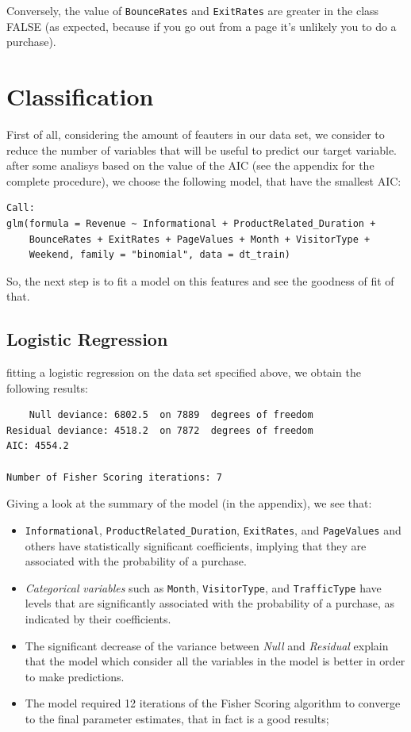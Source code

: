 \documentclass[
]{article}
\begin{document}
Conversely, the value of \texttt{BounceRates} and \texttt{ExitRates} are
greater in the class FALSE (as expected, because if you go out from a
page it's unlikely you to do a purchase).

\newpage

\section{Classification}\label{classification}

First of all, considering the amount of feauters in our data set, we
consider to reduce the number of variables that will be useful to
predict our target variable. after some analisys based on the value of
the AIC (see the appendix for the complete procedure), we choose the
following model, that have the smallest AIC:

\begin{verbatim}
Call:
glm(formula = Revenue ~ Informational + ProductRelated_Duration + 
    BounceRates + ExitRates + PageValues + Month + VisitorType + 
    Weekend, family = "binomial", data = dt_train)
\end{verbatim}

So, the next step is to fit a model on this features and see the
goodness of fit of that.

\subsection{Logistic Regression}\label{logistic-regression}

fitting a logistic regression on the data set specified above, we obtain
the following results:

\begin{verbatim}
    Null deviance: 6802.5  on 7889  degrees of freedom
Residual deviance: 4518.2  on 7872  degrees of freedom
AIC: 4554.2

Number of Fisher Scoring iterations: 7
\end{verbatim}

Giving a look at the summary of the model (in the appendix), we see
that:

\begin{itemize}
\item
  \texttt{Informational}, \texttt{ProductRelated\_Duration},
  \texttt{ExitRates}, and \texttt{PageValues} and others have
  statistically significant coefficients, implying that they are
  associated with the probability of a purchase.
\item
  \emph{Categorical} \emph{variables} such as \texttt{Month},
  \texttt{VisitorType}, and \texttt{TrafficType} have levels that are
  significantly associated with the probability of a purchase, as
  indicated by their coefficients.
\item
  The significant decrease of the variance between \emph{Null} and
  \emph{Residual} explain that the model which consider all the
  variables in the model is better in order to make predictions.
\item
  The model required 12 iterations of the Fisher Scoring algorithm to
  converge to the final parameter estimates, that in fact is a good
  results;
\end{itemize}
\end{document}
